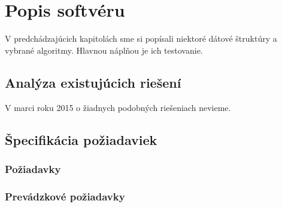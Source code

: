 \chapter{Popis softvéru}\label{chap:popis}

V predchádzajúcich kapitolách sme si popísali niektoré dátové štruktúry a 
vybrané algoritmy. Hlavnou náplňou je ich testovanie. 

\section{Analýza existujúcich riešení}

V marci roku 2015 o žiadnych podobných riešeniach nevieme.



\clearpage
\section{Špecifikácia požiadaviek}


\subsection{Požiadavky}


\subsection{Prevádzkové požiadavky}



